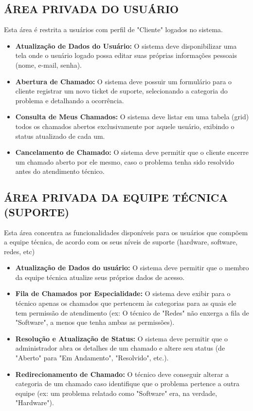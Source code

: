 \documentclass[a4paper, 12pt]{article}
\begin{document}
\subsection{ÁREA PRIVADA DO USUÁRIO}
Esta área é restrita a usuários com perfil de "Cliente" logados no sistema.
    \begin{itemize}
        \item \textbf{Atualização de Dados do Usuário:} O sistema deve disponibilizar uma tela onde o usuário logado possa editar suas próprias informações pessoais (nome, e-mail, senha).
        \item \textbf{Abertura de Chamado:} O sistema deve possuir um formulário para o cliente registrar um novo ticket de suporte, selecionando a categoria do problema e detalhando a ocorrência.
        \item \textbf{Consulta de Meus Chamados:} O sistema deve listar em uma tabela (grid) todos os chamados abertos exclusivamente por aquele usuário, exibindo o status atualizado de cada um.
        \item \textbf{Cancelamento de Chamado:} O sistema deve permitir que o cliente encerre um chamado aberto por ele mesmo, caso o problema tenha sido resolvido antes do atendimento técnico.
    \end{itemize}

\subsection{ÁREA PRIVADA DA EQUIPE TÉCNICA (SUPORTE)}
Esta área concentra as funcionalidades disponíveis para os usuários que compõem a equipe técnica, de acordo com os seus níveis de suporte (hardware, software, redes, etc)
    \begin{itemize}
        \item \textbf{Atualização de Dados do usuário:} O sistema deve permitir que o membro da equipe técnica atualize seus próprios dados de acesso.
        \item  \textbf{Fila de Chamados por Especialidade:} O sistema deve exibir para o técnico apenas os chamados que pertencem às categorias para as quais ele tem permissão de atendimento (ex: O técnico de "Redes" não enxerga a fila de "Software", a menos que tenha ambas as permissões).
        \item \textbf{Resolução e Atualização de Status:}  O sistema deve permitir que o administrador abra os detalhes de um chamado e altere seu status (de "Aberto" para "Em Andamento", "Resolvido", etc.).
        \item \textbf{Redirecionamento de Chamado:} O técnico deve conseguir alterar a categoria de um chamado caso identifique que o problema pertence a outra equipe (ex: um problema relatado como "Software" era, na verdade, "Hardware").
    \end{itemize}
\end{document}
